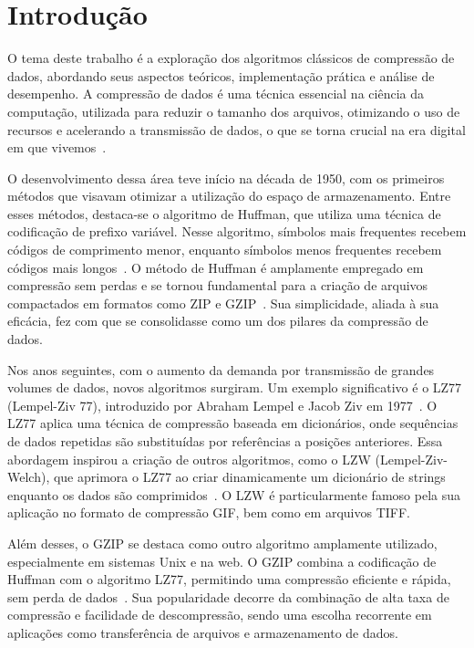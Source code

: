 \chapter{Introdução}
\label{c.introducao}

O tema deste trabalho é a exploração dos algoritmos clássicos de compressão de dados, abordando seus aspectos teóricos, implementação prática e análise de desempenho. A compressão de dados é uma técnica essencial na ciência da computação, utilizada para reduzir o tamanho dos arquivos, otimizando o uso de recursos e acelerando a transmissão de dados, o que se torna crucial na era digital em que vivemos~\cite{salomon2007data}.  

O desenvolvimento dessa área teve início na década de 1950, com os primeiros métodos que visavam otimizar a utilização do espaço de armazenamento. Entre esses métodos, destaca-se o algoritmo de Huffman, que utiliza uma técnica de codificação de prefixo variável. Nesse algoritmo, símbolos mais frequentes recebem códigos de comprimento menor, enquanto símbolos menos frequentes recebem códigos mais longos~\cite{salomon2007data}. O método de Huffman é amplamente empregado em compressão sem perdas e se tornou fundamental para a criação de arquivos compactados em formatos como ZIP e GZIP~\cite{deutsch1996gzip}. Sua simplicidade, aliada à sua eficácia, fez com que se consolidasse como um dos pilares da compressão de dados.  

Nos anos seguintes, com o aumento da demanda por transmissão de grandes volumes de dados, novos algoritmos surgiram. Um exemplo significativo é o LZ77 (Lempel-Ziv 77), introduzido por Abraham Lempel e Jacob Ziv em 1977~\cite{ziv1977universal}. O LZ77 aplica uma técnica de compressão baseada em dicionários, onde sequências de dados repetidas são substituídas por referências a posições anteriores. Essa abordagem inspirou a criação de outros algoritmos, como o LZW (Lempel-Ziv-Welch), que aprimora o LZ77 ao criar dinamicamente um dicionário de strings enquanto os dados são comprimidos~\cite{welch1984technique}. O LZW é particularmente famoso pela sua aplicação no formato de compressão GIF, bem como em arquivos TIFF.  

Além desses, o GZIP se destaca como outro algoritmo amplamente utilizado, especialmente em sistemas Unix e na web. O GZIP combina a codificação de Huffman com o algoritmo LZ77, permitindo uma compressão eficiente e rápida, sem perda de dados~\cite{deutsch1996gzip}. Sua popularidade decorre da combinação de alta taxa de compressão e facilidade de descompressão, sendo uma escolha recorrente em aplicações como transferência de arquivos e armazenamento de dados.  

